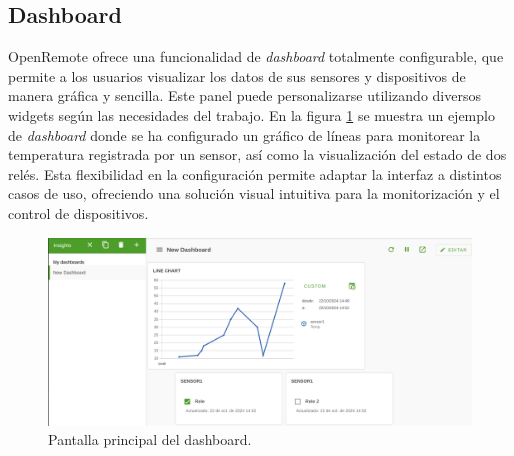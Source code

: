 \subsection{Dashboard}

OpenRemote ofrece una funcionalidad de \textit{dashboard} totalmente configurable, que permite a los usuarios visualizar los datos de sus sensores y dispositivos de manera gráfica y sencilla. Este panel puede personalizarse utilizando diversos widgets según las necesidades del trabajo. En la figura \ref{fig:dashboard} se muestra un ejemplo de \textit{dashboard} donde se ha configurado un gráfico de líneas para monitorear la temperatura registrada por un sensor, así como la visualización del estado de dos relés. Esta flexibilidad en la configuración permite adaptar la interfaz a distintos casos de uso, ofreciendo una solución visual intuitiva para la monitorización y el control de dispositivos.

\begin{figure}[H]
\centering 
\includegraphics[width=1\textwidth]{./Figures/dashboard.png}
\caption{Pantalla principal del dashboard.}
\label{fig:dashboard}
\end{figure} 


